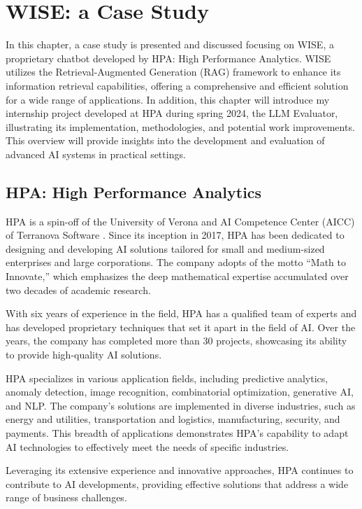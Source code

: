 \section{WISE: a Case Study}

In this chapter, a case study is presented and discussed  focusing on WISE, a proprietary chatbot developed by HPA: High Performance Analytics. WISE utilizes the Retrieval-Augmented Generation (RAG) framework to enhance its information retrieval capabilities, offering a comprehensive and efficient solution for a wide range of applications. In addition, this chapter will introduce my internship project developed at HPA during spring 2024, the LLM Evaluator, illustrating its implementation, methodologies, and potential work improvements. This overview will provide insights into the development and evaluation of advanced AI systems in practical settings.

\subsection{HPA: High Performance Analytics}

HPA is a spin-off of the University of Verona and AI Competence Center (AICC) of Terranova Software \cite{terranova2024}. Since its inception in 2017, HPA has been dedicated to designing and developing AI solutions tailored for small and medium-sized enterprises and large corporations. The company adopts of the motto “Math to Innovate,” which emphasizes the deep mathematical expertise accumulated over two decades of academic research.

With six years of experience in the field, HPA has a qualified team of experts and has developed proprietary techniques that set it apart in the field of AI. Over the years, the company has completed more than 30 projects, showcasing its ability to provide high-quality AI solutions.

HPA specializes in various application fields, including predictive analytics, anomaly detection, image recognition, combinatorial optimization, generative AI, and NLP. The company's solutions are implemented in diverse industries, such as energy and utilities, transportation and logistics, manufacturing, security, and payments. This breadth of applications demonstrates HPA's capability to adapt AI technologies to effectively meet the needs of specific industries.

Leveraging its extensive experience and innovative approaches, HPA continues to contribute to AI developments, providing effective solutions that address a wide range of business challenges.

